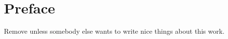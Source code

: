 \cleardoublepage
\chapter*{Preface}


Remove unless somebody else wants to write nice things about this work.





\lipsum[1-2]
